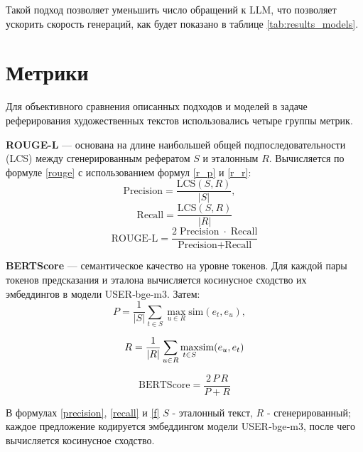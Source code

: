 \documentclass{article}
\begin{document}
Такой подход позволяет уменьшить число обращений к LLM, что позволяет ускорить скорость генераций, как будет показано в таблице \ref{tab:results_models}.


\section*{Метрики}

Для объективного сравнения описанных подходов и моделей в задаче реферирования художественных текстов использовались четыре группы метрик.

\textbf{ROUGE-L} \cite{rouge} — основана на длине наибольшей общей подпоследовательности (LCS) между сгенерированным рефератом $S$ и эталонным $R$.
Вычисляется по формуле \eqref{rouge} с использованием формул \eqref{r_p} и \eqref{r_r}:
\begin{equation}\label{r_p}
  \text{Precision} = \frac{\mathrm{LCS}(S,R)}{|S|},\quad
\end{equation}
\begin{equation}\label{r_r}
  \text{Recall} = \frac{\mathrm{LCS}(S,R)}{|R|}
\end{equation}
\begin{equation}\label{rouge}
  \text{ROUGE‑L} = \frac{2\;\text{Precision}\;\cdot\;\text{Recall}}{\text{Precision} + \text{Recall}}
\end{equation}

\textbf{BERTScore} \cite{bertscore} — семантическое качество на уровне токенов. Для каждой пары токенов предсказания и эталона вычисляется косинусное сходство их эмбеддингов в модели USER‑bge‑m3. Затем:
\begin{equation}\label{precision}
P = \frac{1}{|S|}\sum_{t\in S}\max_{u\in R}\!\mathrm{sim}(e_t, e_u),\quad
\end{equation}

\begin{equation}\label{recall}
R = \frac{1}{|R|}\sum_{u\in R}\max_{t\in S}\!\mathrm{sim}(e_u, e_t)\\
\end{equation}

\begin{equation}\label{f}
\text{BERTScore} = \frac{2\,P\,R}{P+R}
\end{equation}

В формулах  \eqref{precision}, \eqref{recall} и \eqref{f} \(S\) - эталонный текст, \(R\) - сгенерированный; каждое предложение кодируется эмбеддингом модели USER‑bge‑m3, 
после чего вычисляется косинусное сходство.  
\end{document}
